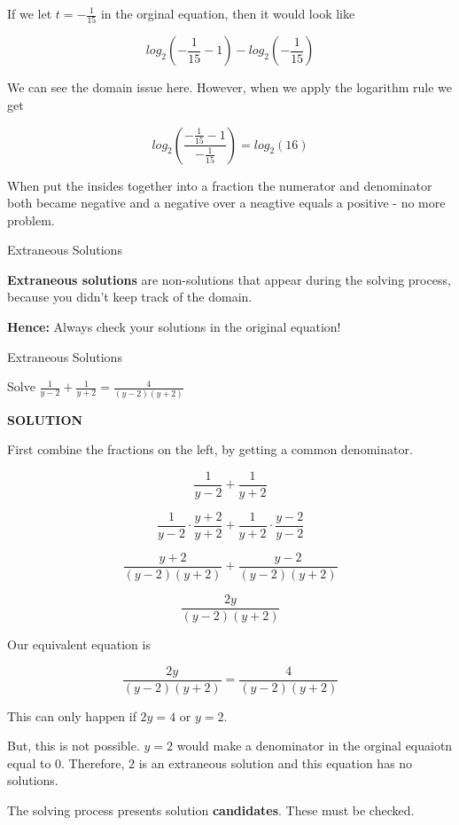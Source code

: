 \documentclass{ximera}
\begin{document}
If we let $t = -\frac{1}{15}$ in the orginal equation, then it would look like 


\[    log_2\left(-\frac{1}{15}-1\right) - log_2\left(-\frac{1}{15}\right)   \]

We can see the domain issue here.  However, when we apply the logarithm rule we get



\[   log_2\left(\frac{-\frac{1}{15}-1}{-\frac{1}{15}}\right)    = log_2(16)  \]


When put the insides together into a fraction the numerator and denominator both became negative and a negative over a neagtive equals a positive - no more problem.





\begin{definition} Extraneous Solutions

\textbf{Extraneous solutions} are non-solutions that appear during the solving process, because you didn't keep track of the domain.

\end{definition}

\textbf{Hence:} Always check your solutions in the original equation!







\begin{example} Extraneous Solutions


Solve $\frac{1}{y-2} + \frac{1}{y+2} = \frac{4}{(y-2)(y+2)}$


\textbf{\textcolor{purple!50!blue!90!black}{SOLUTION}}



First combine the fractions on the left, by getting a common denominator.



\[    \frac{1}{y-2} + \frac{1}{y+2}        \]

\[    \frac{1}{y-2} \cdot \frac{y+2}{y+2} + \frac{1}{y+2}  \cdot \frac{y-2}{y-2}       \]

\[    \frac{y+2}{(y-2)(y+2)} + \frac{y-2}{(y-2)(y+2)}      \]

\[    \frac{2y}{(y-2)(y+2)}     \]

Our equivalent equation is


\[    \frac{2y}{(y-2)(y+2)}   = \frac{4}{(y-2)(y+2)}   \]


This can only happen if $2y = 4$ or $y = 2$.

But, this is not possible.  $y=2$ would make a denominator in the orginal equaiotn equal to $0$.  Therefore, $2$ is an extraneous solution and this equation has no solutions.


\end{example}
The solving process presents solution \textbf{candidates}.  These must be checked.
\end{document}
